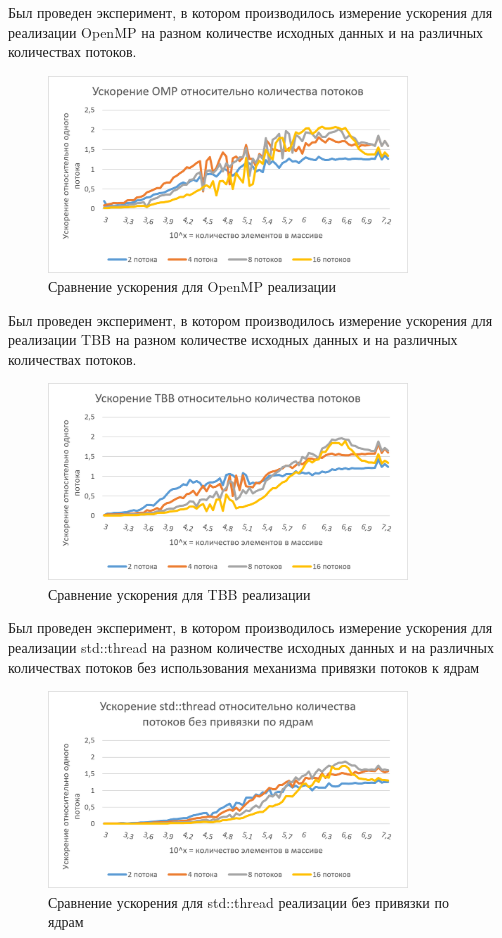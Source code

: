 \documentclass{report}
\begin{document}
\par Был проведен эксперимент, в котором производилось измерение ускорения для реализации OpenMP на разном количестве исходных данных и на различных количествах потоков.
\begin{figure}[H]
    \centering
    \includegraphics[width=0.85\textwidth]{boost_omp.png}
    \caption{Сравнение ускорения для OpenMP реализации}
    \label{fig:my_label_3}
\end{figure}
\par Был проведен эксперимент, в котором производилось измерение ускорения для реализации TBB на разном количестве исходных данных и на различных количествах потоков.
\begin{figure}[H]
    \centering
    \includegraphics[width=0.85\textwidth]{boost_tbb.png}
    \caption{Сравнение ускорения для TBB реализации}
    \label{fig:my_label_4}
\end{figure}
\par Был проведен эксперимент, в котором производилось измерение ускорения для реализации std::thread на разном количестве исходных данных и на различных количествах потоков без использования механизма привязки потоков к ядрам
\begin{figure}[H]
    \centering
    \includegraphics[width=0.85\textwidth]{boost_std_without_affinity.png}
    \caption{Сравнение ускорения для std::thread реализации без привязки по ядрам}
    \label{fig:my_label_5}
\end{figure}
\end{document}

